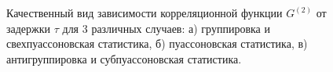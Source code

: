 \begin{figure}
\centering



\caption{Качественный вид зависимости корреляционной функции $G^{(2)}$ от задержки
  $\tau$ для 3 различных случаев: а) группировка и
  свехпуассоновская статистика, б) пуассоновская статистика, в)
  антигруппировка и  субпуассоновская статистика. }
\label{figPart3Nonclass3}
\end{figure}
